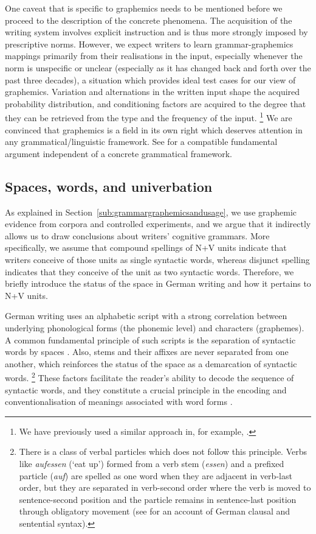 \documentclass[biblatex, charis, linguex]{glossa}\usepackage{knitr}
\begin{document}
One caveat that is specific to graphemics needs to be mentioned before we proceed to the description of the concrete phenomena.
The acquisition of the writing system involves explicit instruction and is thus more strongly imposed by prescriptive norms.
However, we expect writers to learn grammar-graphemics mappings primarily from their realisations in the input, especially whenever the norm is unspecific or unclear (especially as it has changed back and forth over the past three decades), a situation which provides ideal test cases for our view of graphemics.
Variation and alternations in the written input shape the acquired probability distribution, and conditioning factors are acquired to the degree that they can be retrieved from the type and the frequency of the input.%
\footnote{We have previously used a similar approach in, for example, \citet{SchaeferSayatz2014,SchaeferSayatz2016}.}
We are convinced that graphemics is a field in its own right which deserves attention in any grammatical\slash linguistic framework.
See \citet{Berg2016} for a compatible fundamental argument independent of a concrete grammatical framework.

\subsection{Spaces, words, and univerbation}
\label{sub:spaceswordsanduniverbation}

As explained in Section~\ref{sub:grammargraphemicsandusage}, we use graphemic evidence from corpora and controlled experiments, and we argue that it indirectly allows us to draw conclusions about writers' cognitive grammars.
More specifically, we assume that compound spellings of N+V units indicate that writers conceive of those units as single syntactic words, whereas disjunct spelling indicates that they conceive of the unit as two syntactic words.
Therefore, we briefly introduce the status of the space in German writing and how it pertains to N+V units.

German writing uses an alphabetic script with a strong correlation between underlying phonological forms (the phonemic level) and characters (graphemes).
A common fundamental principle of such scripts is the separation of syntactic words by spaces \parencite[22]{Jacobs2005}.
Also, stems and their affixes are never separated from one another, which reinforces the status of the space as a demarcation of syntactic words.%
\footnote{There is a class of verbal particles which does not follow this principle.
Verbs like \textit{aufessen} (`eat up') formed from a verb stem (\textit{essen}) and a prefixed particle (\textit{auf}) are spelled as one word when they are adjacent in verb-last order, but they are separated in verb-second order where the verb is moved to sentence-second position and the particle remains in sentence-last position through obligatory movement (see \citealt{Hoberg1981} for an account of German clausal and sentential syntax).}
These factors facilitate the reader's ability to decode the sequence of syntactic words, and they constitute a crucial principle in the encoding and conventionalisation of meanings associated with word forms \parencite[22]{Jacobs2005}.
\end{document}
